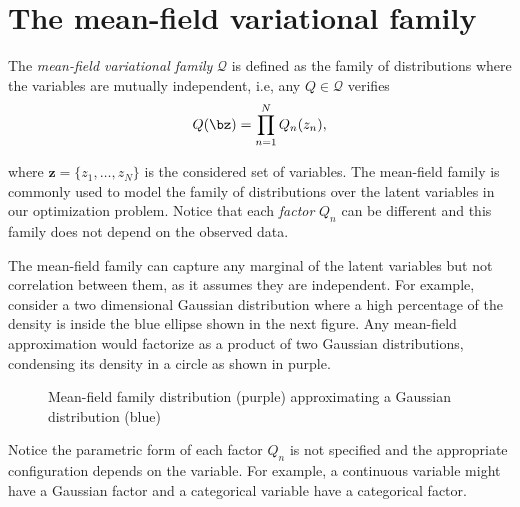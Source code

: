 
\section{The mean-field variational family}

The \emph{mean-field variational family} \(\mathcal{Q}\) is defined as the family of distributions where the variables are mutually independent, i.e, any \(Q \in \mathcal{Q}\) verifies
\[
  Q(\bz) = \prod_{n=1}^{N}Q_{n}(z_{n}),
\]

where \(\bm{z} = \{z_{1},\dots,z_{N}\}\) is the considered set of variables. The mean-field family is commonly used to model the family of distributions over the latent variables in our optimization problem. Notice that each \emph{factor} \(Q_{n}\) can be different and this family does not depend on the observed data.

The mean-field family can capture any marginal of the latent variables but not correlation between them, as it assumes they are independent. For example, consider a two dimensional Gaussian distribution where a high percentage of the density is inside the blue ellipse shown in the next figure. Any mean-field approximation would factorize as a product of two Gaussian distributions, condensing its density in a circle as shown in purple.

\begin{figure}[h!]
\centering
{}
  \caption{Mean-field family distribution (purple) approximating a Gaussian distribution (blue)}
\end{figure}

Notice the parametric form of each factor \(Q_{n}\) is not specified and the appropriate configuration depends on the variable. For example, a continuous variable might have a Gaussian factor and a categorical variable have a categorical factor.

